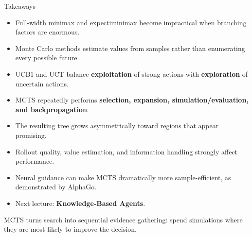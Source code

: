 \documentclass[aspectratio=169,10pt]{beamer}
\begin{document}
\begin{frame}[shrink=18]{Takeaways}
  \begin{itemize}
    \item Full-width minimax and expectiminimax become impractical when branching factors are enormous.
    \item Monte Carlo methods estimate values from samples rather than enumerating every possible future.
    \item UCB1 and UCT balance \textbf{exploitation} of strong actions with \textbf{exploration} of uncertain actions.
    \item MCTS repeatedly performs \textbf{selection, expansion, simulation/evaluation, and backpropagation}.
    \item The resulting tree grows asymmetrically toward regions that appear promising.
    \item Rollout quality, value estimation, and information handling strongly affect performance.
    \item Neural guidance can make MCTS dramatically more sample-efficient, as demonstrated by AlphaGo.
    \item Next lecture: \textbf{Knowledge-Based Agents}.
  \end{itemize}
  \begin{keyidea}
    MCTS turns search into sequential evidence gathering: spend simulations where they are most likely to improve the decision.
  \end{keyidea}
\end{frame}
\end{document}
